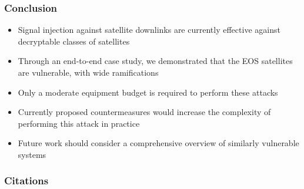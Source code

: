 \documentclass{beamer}
\begin{document}
\begin{frame}
  \frametitle{Conclusion}
  \begin{itemize}[<+->]
    \item Signal injection against satellite downlinks are currently effective against decryptable classes of satellites
    \item Through an end-to-end case study, we demonstrated that the EOS satellites are vulnerable, with wide ramifications
    \item Only a moderate equipment budget is required to perform these attacks
    \item Currently proposed countermeasures would increase the complexity of performing this attack in practice
    \item Future work should consider a comprehensive overview of similarly vulnerable systems
  \end{itemize}
\end{frame}



\begin{frame}
  \frametitle{Citations}
  
  
\end{frame}
\end{document}
